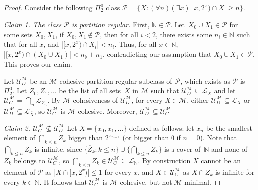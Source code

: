 \documentclass[10pt,a4paper]{amsart}
\def\A{\mathcal{A}}
\renewcommand{\L}[0]{\mathcal{L}}
\def\M{\mathcal{M}}
\def\NN{\mathbb{N}}
\def\P{\mathcal{P}}
\def\U{\mathcal{U}}
\begin{document}
\begin{proof}
Consider the following $\Pi_2^0$ class $\P = \{X : (\forall n)(\exists x) |[x,2^x) \cap X| \geq n\}$.
\smallskip

\emph{Claim 1. The class $\P$ is partition regular.} First, $\NN \in \P$. Let~$X_0 \cup X_1 \in \P$ for some sets $X_0,X_1$, if $X_0,X_1 \notin \P$, then for all $i < 2$, there exists some $n_i \in \NN$ such that for all $x$, and  $|[x,2^x) \cap X_i| < n_i$. Thus, for all $x \in \NN$, $|[x,2^x) \cap (X_0 \cup X_1)| < n_0 + n_1$, contradicting our assumption that $X_0 \cup X_1 \in \P$. This proves our claim.
\smallskip

Let $\U_D^\M$ be an $\M$-cohesive partition regular subclass of~$\P$, which exists as $\P$ is $\Pi^0_2$.
Let $Z_0, Z_1, \dots$ be the list of all sets~$X$ in $\M$ such that $\U_D^\M \subseteq \L_X$ and
let $\U_C^\M = \bigcap_n \L_{Z_n}$.
By $\M$-cohesiveness of $\U_D^\M$, for every $X \in \M$, either $\U_D^\M \subseteq \L_X$ or $\U_D^\M \subseteq \L_{\overline{X}}$, so $\U_C^\M$ is $\M$-cohesive. Moreover, $\U_D^\M \subseteq \U_C^\M$.
\smallskip

\emph{Claim 2. $\U_C^\M \not \subseteq \U_D^\M$}
Let $X = \{x_0, x_1, \dots \}$ defined as follows: let $x_n$ be the smallest element of $\bigcap_{k \leq n} Z_k$ bigger than $2^{x_{n-1}}$ (or bigger than $0$ if $n = 0$). Note that $\bigcap_{k \leq n} Z_k$ is infinite, since $\{ \overline{Z}_k : k \leq n \} \cup \{\bigcap_{k \leq n} Z_k\}$ is a cover of~$\NN$ and none of $\overline{Z}_k$ belongs to $\U_C^\M$, so $\bigcap_{k \leq n} Z_k \in \U_C^\M \subseteq \L_\NN$. By construction $X$ cannot be an element of $\P$ as $|X \cap [x,2^x)| \leq 1$ for every $x$, and $X \in \U_C^\M$ as $X \cap Z_k$ is infinite for every $k \in \NN$.
It follows that $\U_C^\M$ is $\M$-cohesive, but not $\M$-minimal.





\end{proof}
\end{document}
